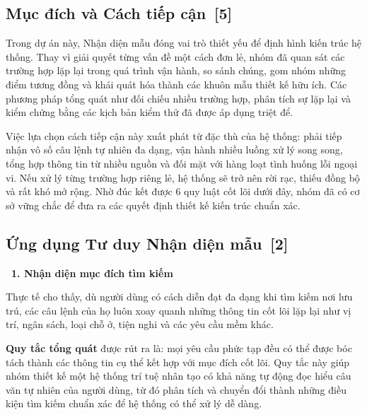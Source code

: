\documentclass[12pt, a4paper]{article}
\begin{document}
\subsection[Mục đích và Cách tiếp cận]{Mục đích và Cách tiếp cận \,{\normalfont\small\textcolor{cyan!70!black}{[5]}}}
Trong dự án này, Nhận diện mẫu đóng vai trò thiết yếu để định hình kiến trúc hệ thống. Thay vì giải quyết từng vấn đề một cách đơn lẻ, nhóm đã quan sát các trường hợp lặp lại trong quá trình vận hành, so sánh chúng, gom nhóm những điểm tương đồng và khái quát hóa thành các khuôn mẫu thiết kế hữu ích. Các phương pháp tổng quát như đối chiếu nhiều trường hợp, phân tích sự lặp lại và kiểm chứng bằng các kịch bản kiểm thử đã được áp dụng triệt để.

\noindent Việc lựa chọn cách tiếp cận này xuất phát từ đặc thù của hệ thống: phải tiếp nhận vô số câu lệnh tự nhiên đa dạng, vận hành nhiều luồng xử lý song song, tổng hợp thông tin từ nhiều nguồn và đối mặt với hàng loạt tình huống lỗi ngoại vi. Nếu xử lý từng trường hợp riêng lẻ, hệ thống sẽ trở nên rời rạc, thiếu đồng bộ và rất khó mở rộng. Nhờ đúc kết được 6 quy luật cốt lõi dưới đây, nhóm đã có cơ sở vững chắc để đưa ra các quyết định thiết kế kiến trúc chuẩn xác.

\subsection[Ứng dụng Tư duy Nhận diện mẫu]{Ứng dụng Tư duy Nhận diện mẫu \,{\normalfont\small\textcolor{cyan!70!black}{[2]}}}


\vspace{0.2cm}
\noindent\textcolor{blue!80!black}{\textbf{\faSearch \ 1. Nhận diện mục đích tìm kiếm}}
\vspace{0.15cm}

\begin{tcolorbox}[blanker, borderline west={3pt}{0pt}{blue!60!black}, left=12pt, top=2pt, bottom=2pt]
Thực tế cho thấy, dù người dùng có cách diễn đạt đa dạng khi tìm kiếm nơi lưu trú, các câu lệnh của họ luôn xoay quanh những thông tin cốt lõi lặp lại như vị trí, ngân sách, loại chỗ ở, tiện nghi và các yêu cầu mềm khác.

\vspace{0.15cm}
\noindent \textbf{Quy tắc tổng quát} được rút ra là: mọi yêu cầu phức tạp đều có thể được bóc tách thành các thông tin cụ thể kết hợp với mục đích cốt lõi. Quy tắc này giúp nhóm thiết kế một hệ thống trí tuệ nhân tạo có khả năng tự động đọc hiểu câu văn tự nhiên của người dùng, từ đó phân tích và chuyển đổi thành những điều kiện tìm kiếm chuẩn xác để hệ thống có thể xử lý dễ dàng.
\end{tcolorbox}
\end{document}
